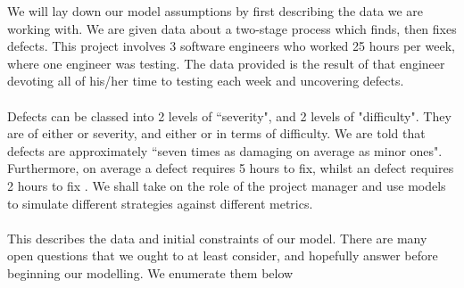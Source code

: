 We will lay down our model assumptions by first describing the data we are working with.
We are given data about a two-stage process which finds, then fixes defects.
This project involves 3 software engineers who worked 25 hours per week, where one engineer was testing.
The data provided is the result of that engineer devoting all of his/her time to testing each
week and uncovering defects.\\
\\
Defects can be classed into 2 levels of ``severity", and 2 levels of "difficulty".
They are of either \major or \minor severity, and either \easy or \hard in terms of difficulty.
We are told that \major defects are approximately ``seven times as damaging on average as minor
ones".
Furthermore, on average a \hard defect requires 5 hours to fix, whilst an \easy defect requires 2
hours to fix \cite{duterryassspeci}.
We shall take on the role of the project manager and use models to simulate different strategies against different
metrics.\\
\\
This describes the data and initial constraints of our model.
There are many open questions that we ought to at least consider, and hopefully answer before
beginning our modelling.
We enumerate them below

